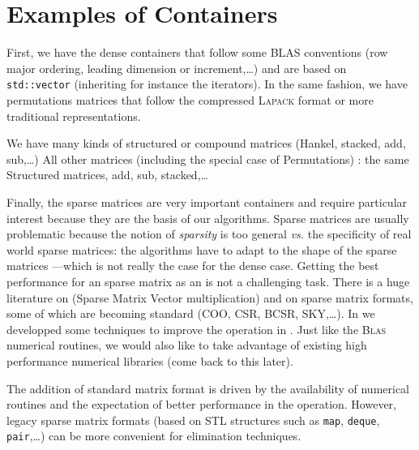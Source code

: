 \section{Examples of Containers}
%
First, we have the dense containers that follow some BLAS conventions (row
major ordering, leading dimension or increment,\ldots) and are based on {\tt
std::vector} (inheriting for instance the iterators). In the same fashion, we
have permutations matrices that follow the compressed \textsc{Lapack} format or
more traditional representations.
%
\par
%
We have many kinds of structured or compound matrices (Hankel, stacked, add, sub,\ldots)
All other matrices (including the special case of Permutations) : the same
Structured matrices, add, sub, stacked,\dots
%
\par
%
Finally, the sparse matrices are very important containers and require
particular interest because they are the basis of our \applin algorithms.
%
%
Sparse matrices are usually problematic because the notion of \emph{sparsity}
is too general \emph{vs.} the specificity of real world sparse matrices: the
algorithms have to adapt to the shape of the sparse matrices ---which is not really the case
for the dense case.
%
Getting the best performance for an sparse matrix as an \applin is not a
challenging task. There is a huge literature on \spmv (Sparse Matrix Vector
multiplication) and on sparse matrix formats, some of which are becoming
standard (COO, CSR, BCSR, SKY,\ldots).  In \cite{Boyer:2010:spmv} we developped
some techniques to improve the \spmv operation in \linbox.
Just like the \textsc{Blas} numerical
routines, we would also like to take advantage of existing high performance
numerical libraries (come back to this later).
%
\par
%
The addition of standard matrix format is driven by the availability of
numerical routines and the expectation of better performance in the \spmv
operation. However, legacy \linbox sparse matrix formats (based on STL
structures such as {\tt map}, {\tt deque}, {\tt pair},\ldots) can be more
convenient for elimination techniques.
%
%
\par
%
%
%
